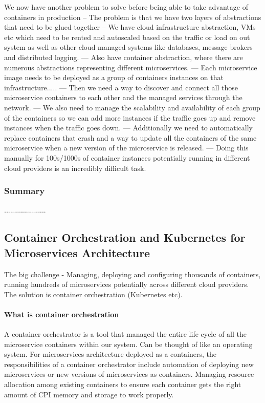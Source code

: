 \documentclass[a4paper, 11pt]{book}
\begin{document}
    We now have another problem to solve before being able to take advantage of containers in production
    -- The problem is that we have two layers of abstractions that need to be glued together
    -- We have cloud infrastructure abstraction, VMs etc which need to be rented and autoscaled based on the traffic or load on out system as well as other cloud managed systems like databases, message brokers and distributed logging.
    --- Also have container abstraction, where there are numerous abstractions representing different microservices.
    --- Each microservice image needs to be deployed as a group of containers instances on that infrastructure.....
    --- Then we need a way to discover and connect all those microservice containers to each other and the managed services through the network.
    --- We also need to manage the scalability and availability of each group of the containers so we can add more instances if the traffic goes up and remove instances when the traffic goes down.
    --- Additionally we need to automatically replace containers that crash and a way to update all the containers of the same microservice when a new version of the microservice is released.
    --- Doing this manually for 100s/1000s of container instances potentially running in different cloud providers is an incredibly difficult task.

    \subsubsection{Summary}
    .....................

    \subsection{Container Orchestration and Kubernetes for Microservices Architecture}
    The big challenge - Managing, deploying and configuring thousands of containers, running hundreds of microservices potentially across different cloud providers.
    The solution is container orchestration (Kubernetes etc).

    \paragraph{What is container orchestration}
    A container orchestrator is a tool that managed the entire life cycle of all the microservice containers within our system.
    Can be thought of like an operating system.
    For microservices architecture deployed as a containers, the responsibilities of a container orchestrator include automation of deploying new microservices or new versions of microservices as containers.
    Managing resource allocation among existing containers to ensure each container gets the right amount of CPI memory and storage to work properly.
\end{document}
